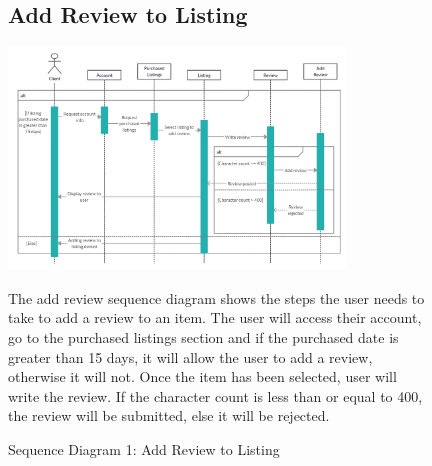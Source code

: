 \documentclass[11pt]{article}
\newcounter{use case ID}
\begin{document}
\begin{figure}[ht!]
    \subsection{Add Review to Listing}
    \centering
    \includegraphics[width=0.8\textwidth,height=0.3\paperheight]{Diagrams/Sequence/Add_Review.png}
    \caption{Sequence Diagram 1: Add Review to Listing}
    \label{fig: Add Review to Listing}
    \begin{justify}
        The add review sequence diagram shows the steps the user
        needs to take to add a review to an item. The user will access their account, go to the purchased listings section and if the purchased date is greater than 15 days, it will allow the user to add a review, otherwise it will not. Once the item has been selected, user will write the review. If the character count is less than or equal to 400, the review will be submitted, else it will be rejected.
    \end{justify}
\end{figure}
\end{document}
